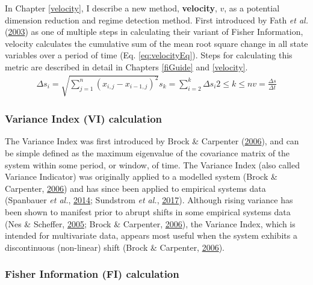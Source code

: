 \documentclass[12pt,twoside,openany]{reedthesis}
\begin{document}
In Chapter \ref{velocity}, I describe a new method, \textbf{velocity}, \(v\), as a potential dimension reduction and regime detection method. First introduced by Fath \emph{et al.} (\protect\hyperlink{ref-fath_regime_2003}{2003}) as one of multiple steps in calculating their variant of Fisher Information, velocity calculates the cumulative sum of the mean root square change in all state variables over a period of time (Eq. \eqref{eq:velocityEq}). Steps for calculating this metric are described in detail in Chapters \ref{fiGuide} and \ref{velocity}.
\begin{equation}
\begin{array}{rcr}
\Delta s_i = \sqrt{\sum_{j=1}^{n} (x_{i,j} -x_{i-1, j})^2}
s_k =  \sum_{i=2}^{k}\Delta{s_i}
2\leq k \leq n
v =\frac{\Delta s}{\Delta t}  
\end{array}
\label{eq:velocityEq}
\end{equation}
\hypertarget{variance-index-vi-calculation}{%
\subsubsection{Variance Index (VI) calculation}\label{variance-index-vi-calculation}}

The Variance Index was first introduced by Brock \& Carpenter (\protect\hyperlink{ref-brock_variance_2006}{2006}), and can be simple defined as the maximum eigenvalue of the covariance matrix of the system within some period, or window, of time. The Variance Index (also called Variance Indicator) was originally applied to a modelled system (Brock \& Carpenter, \protect\hyperlink{ref-brock_variance_2006}{2006}) and has since been applied to empirical systems data (Spanbauer \emph{et al.}, \protect\hyperlink{ref-spanbauer_prolonged_2014}{2014}; Sundstrom \emph{et al.}, \protect\hyperlink{ref-sundstrom2017detecting}{2017}). Although rising variance has been shown to manifest prior to abrupt shifts in some empirical systems data (Nes \& Scheffer, \protect\hyperlink{ref-van2005implications}{2005}; Brock \& Carpenter, \protect\hyperlink{ref-brock_variance_2006}{2006}), the Variance Index, which is intended for multivariate data, appears most useful when the system exhibits a discontinuous (non-linear) shift (Brock \& Carpenter, \protect\hyperlink{ref-brock_variance_2006}{2006}).

\hypertarget{fisher-information-fi-calculation}{%
\subsubsection{Fisher Information (FI) calculation}\label{fisher-information-fi-calculation}}
\end{document}
